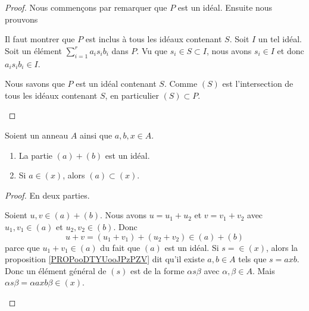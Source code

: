\begin{proof}
	Nous commençons par remarquer que \( P\) est un idéal. Ensuite nous prouvons
	\begin{subproof}
		\spitem[\( P\subset (S)\)]
		Il faut montrer que \( P\) est inclus à tous les idéaux contenant \( S\). Soit \( I\) un tel idéal. Soit un élément \( \sum_{i=1}^ra_is_ib_i\) dans \( P\). Vu que \( s_i\in S\subset I\), nous avons \( s_i\in I\) et donc \( a_is_ib_i\in I\).

		\spitem[\( (S)\subset P\)]
		Nous savons que \( P\) est un idéal contenant \( S\). Comme \( (S)\) est l'intersection de tous les idéaux contenant \( S\), en particulier \( (S)\subset P\).
	\end{subproof}
\end{proof}


\begin{proposition}	\label{PROPooFDJXooYbXEpo}
	Soient un anneau \( A\) ainsi que \( a,b,x\in A\).
	\begin{enumerate}
		\item		\label{ITEMooVFXMooPljoHf}
		      La partie \( (a)+(b)\) est un idéal.
		\item	\label{ITEMooMXHAooHPnAdu}
		      Si \( a\in (x)\), alors \( (a)\subset (x)\).
	\end{enumerate}
\end{proposition}

\begin{proof}
	En deux parties.
	\begin{subproof}
		\spitem[Pour \ref{ITEMooVFXMooPljoHf}]
		Soient \( u,v\in (a)+(b)\). Nous avons \( u=u_1+u_2\) et \( v=v_1+v_2\) avec \( u_1,v_1\in (a)\) et \( u_2,v_2\in (b)\). Donc
		\begin{equation}
			u+v=(u_1+v_1)+(u_2+v_2)\in (a)+(b)
		\end{equation}
		parce que \( u_1+v_1\in (a)\) du fait que \( (a)\) est un idéal.
		\spitem[Pour \ref{ITEMooMXHAooHPnAdu}]
		Si \( s=\in (x)\), alors la proposition \ref{PROPooDTYUooJPzPZV} dit qu'il existe \( a,b\in A\) tels que \( s=axb\). Donc un élément général de \( (s)\) est de la forme \( \alpha s\beta\) avec \( \alpha,\beta\in A\). Mais \( \alpha s\beta=\alpha axb\beta\in (x)\).
	\end{subproof}
\end{proof}

